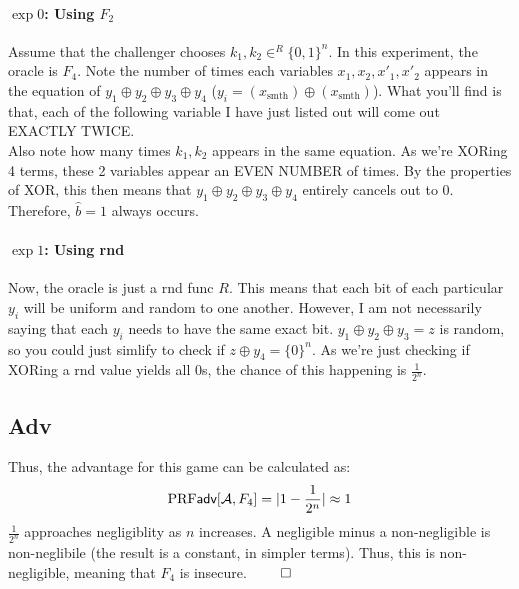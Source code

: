 \documentclass[12pt]{article}
\begin{document}
\begin{problem}
\begin{solution}
\paragraph{$\exp 0$: Using $F_2$}
Assume that the challenger chooses $k_1, k_2 \in^R \{0, 1\}^n$. In this experiment, the oracle is $F_4$. Note the number of times each variables 
$x_1, x_2, x'_1, x'_2$ appears in the equation of $y_1 \oplus y_2 \oplus y_3 \oplus y_4$ ($y_i = (x_{\text{smth}}) \oplus (x_{\text{smth}})$). What you'll find is that, 
each of the following variable I have just listed out will come out EXACTLY TWICE.\\
\indent Also note how many times $k_1, k_2$ appears in the same equation. As we're XORing 4 terms, these 2 variables appear an EVEN NUMBER of times. 
By the properties of XOR, this then means that $y_1 \oplus y_2 \oplus y_3 \oplus y_4$ entirely cancels out to $0$. Therefore, $\hat{b} = 1$ always occurs.

\paragraph{$\exp 1$: Using rnd}
Now, the oracle is just a rnd func $R$. This means that each bit of each particular $y_i$ will be uniform and random to one another. However, I am not
necessarily saying that each $y_i$ needs to have the same exact bit. $y_1 \oplus y_2 \oplus y_3 = z$ is random, so you could just simlify to check if
$z \oplus y_4 = \{0\}^n$. As we're just checking if XORing a rnd value yields all $0$s, the chance of this happening is $\frac{1}{2^n}$.

\subsection*{Adv}
Thus, the advantage for this game can be calculated as:
\begin{equation*}
  \textrm{PRF}\textsf{adv}[\mathcal{A}, F_4] = |1 - \frac{1}{2^n}| \approx 1
\end{equation*}
$\frac{1}{2^n}$ approaches negligiblity as $n$ increases. A negligible minus a non-negligible is non-neglibile (the result is a constant, in simpler terms). Thus, this is non-negligible, meaning that $F_4$ is insecure. $\qed$
\end{solution}
\end{problem}
\end{document}
